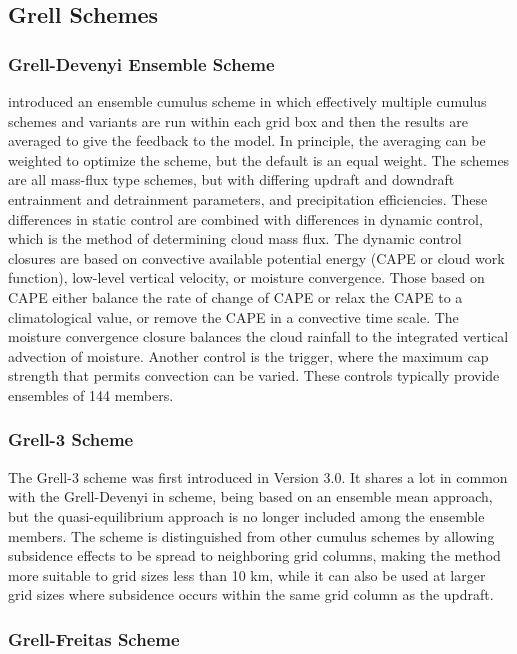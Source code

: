 \subsection{Grell Schemes}

\subsubsection{Grell-Devenyi Ensemble Scheme}

\citet{grell02} introduced an ensemble cumulus scheme 
in which effectively multiple cumulus schemes and variants are run 
within each grid box and then the results are averaged to give the 
feedback to the model. In principle, the averaging can be weighted 
to optimize the scheme, but the default is an equal weight. 
The schemes are all mass-flux type schemes, but with differing updraft 
and downdraft entrainment and detrainment parameters, and precipitation 
efficiencies. These differences in static control are combined with 
differences in dynamic control, which is the method of determining 
cloud mass flux. The dynamic control closures are based on convective 
available potential energy (CAPE or cloud work function), low-level 
vertical velocity, or moisture convergence. Those based on CAPE 
either balance the rate of change of CAPE or relax the CAPE to a 
climatological value, or remove the CAPE in a convective time scale. 
The moisture convergence closure balances the cloud rainfall to the 
integrated vertical advection of moisture. Another control
is the trigger, where the maximum cap strength that permits convection
can be varied. These controls typically provide ensembles of 144 members.

\subsubsection{Grell-3 Scheme}

The Grell-3 scheme was first introduced in Version 3.0. It shares a lot in
common with the Grell-Devenyi in scheme, being based on an ensemble mean
approach, but the quasi-equilibrium approach is no longer included
among the ensemble members. The scheme is distinguished from other
cumulus schemes by allowing subsidence effects to be spread to
neighboring grid columns, making the method more suitable to grid sizes
less than 10 km, while it can also be used at larger grid sizes where
subsidence occurs within the same grid column as the updraft. 

\subsubsection{Grell-Freitas Scheme}

